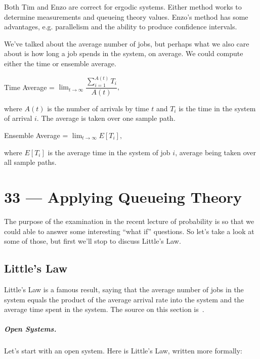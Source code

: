 \documentclass[a4paper]{report}
\begin{document}
Both Tim and Enzo are correct for ergodic systems. Either method works to determine measurements and queueing theory values. Enzo's method has some advantages, e.g. parallelism and the ability to produce confidence intervals.

We've talked about the average number of jobs, but perhaps what we also care about is how long a job spends in the system, on average. We could compute either the time or ensemble average. 

\begin{center}
	Time Average = $\lim_{t\to\infty}\dfrac{\sum_{i=1}^{A(t)} T_{i}}{A(t)},$
\end{center}

where $A(t)$ is the number of arrivals by time $t$ and $T_{i}$ is the time in the system of arrival $i$. The average is taken over one sample path.

\begin{center}
	Ensemble Average = $\lim_{t\to\infty}E[T_{i}],$
\end{center}

where $E[T_{i}]$ is the average time in the system of job $i$, average being taken over all sample paths.









\chapter*{33 --- Applying Queueing Theory}


The purpose of the examination in the recent lecture of probability is so that we could able to answer some interesting ``what if'' questions. So let's take a look at some of those, but first we'll stop to discuss Little's Law.

\section*{Little's Law}
Little's Law is a famous result, saying that the average number of jobs in the system equals the product of the average arrival rate into the system and the average time spent in the system. The source on this section is~\cite{pmd}.

\paragraph{Open Systems.} Let's start with an open system. Here is Little's Law, written more formally:
\end{document}
